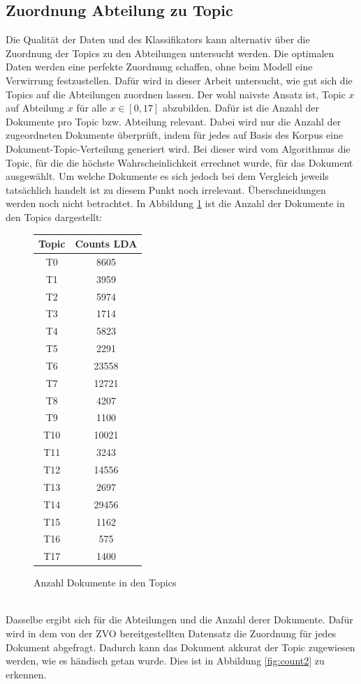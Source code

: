 \documentclass[german,version-2020-11]{uzl-thesis}
\begin{document}
\subsection{Zuordnung Abteilung zu Topic}
Die Qualität der Daten und des Klassifikators kann alternativ über die Zuordnung der Topics zu den Abteilungen untersucht werden. Die optimalen Daten werden eine perfekte Zuordnung schaffen, ohne beim Modell eine Verwirrung festzustellen. Dafür wird in dieser Arbeit untersucht, wie gut sich die Topics auf die Abteilungen zuordnen lassen. Der wohl naivste Ansatz ist, Topic $x$ auf Abteilung $x$ für alle $x \in [0,17]$ abzubilden. Dafür ist die Anzahl der Dokumente pro Topic bzw. Abteilung relevant. Dabei wird nur die Anzahl der zugeordneten Dokumente überprüft, indem für jedes auf Basis des Korpus eine Dokument-Topic-Verteilung generiert wird. Bei dieser wird vom Algorithmus die Topic, für die die höchste Wahrscheinlichkeit errechnet wurde, für das Dokument ausgewählt. Um welche Dokumente es sich jedoch bei dem Vergleich jeweils tatsächlich handelt ist zu diesem Punkt noch irrelevant. Überschneidungen werden noch nicht betrachtet. In Abbildung \ref{fig:count1} ist die Anzahl der Dokumente in den Topics dargestellt:

\begin{figure}[H]
\begin{center}
\begin{tabular}{cc}
\hline 
\hline
Topic&Counts LDA\\
\hline
T0&8605\\
T1&3959\\
T2&5974\\
T3&1714\\
T4&5823\\
T5&2291\\
T6&23558\\
T7&12721\\
T8&4207\\
T9&1100\\
T10&10021\\
T11&3243\\
T12&14556\\
T13&2697\\
T14&29456\\
T15&1162\\
T16&575\\
T17&1400\\
\hline
\hline
\end{tabular}
\caption{Anzahl Dokumente in den Topics}
\label{fig:count1}
\end{center}
\end{figure}
\\
Dasselbe ergibt sich für die Abteilungen und die Anzahl derer Dokumente. Dafür wird in dem von der ZVO bereitgestellten Datensatz die Zuordnung für jedes Dokument abgefragt. Dadurch kann das Dokument akkurat der Topic zugewiesen werden, wie es händisch getan wurde. Dies ist in Abbildung \ref{fig:count2} zu erkennen. \\ 
\end{document}
